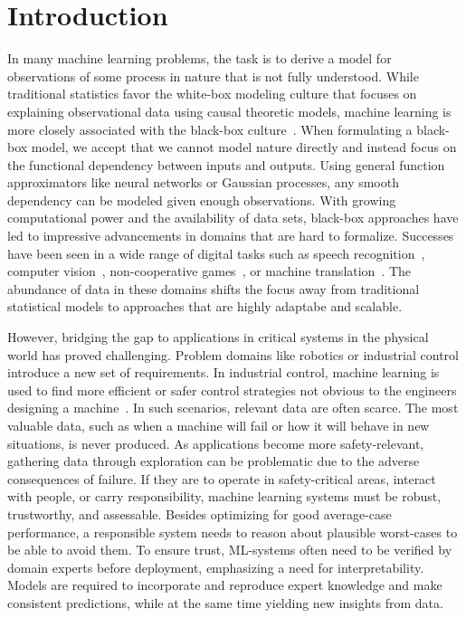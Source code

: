 \chapter{Introduction}
\label{toc:introduction}
In many machine learning problems, the task is to derive a model for observations of some process in nature that is not fully understood.
While traditional statistics favor the white-box modeling culture that focuses on explaining observational data using causal theoretic models, machine learning is more closely associated with the black-box culture~\parencite{breiman_statistical_2001,shmueli_explain_2010}.
When formulating a black-box model, we accept that we cannot model nature directly and instead focus on the functional dependency between inputs and outputs.
Using general function approximators like neural networks or Gaussian processes, any smooth dependency can be modeled given enough observations.
With growing computational power and the availability of data sets, black-box approaches have led to impressive advancements in domains that are hard to formalize.
Successes have been seen in a wide range of digital tasks such as speech recognition~\parencite{hochreiter_long_1997,chorowski_attention-based_2015,bahdanau_neural_2014,chorowski_attention-based_2015}, computer vision~\parencite{russakovsky_imagenet_2015,lecun_backpropagation_1989}, non-cooperative games~\parencite{berner_dota_2019,silver_mastering_2016}, or machine translation~\parencite{johnson_googles_2017}.
The abundance of data in these domains shifts the focus away from traditional statistical models to approaches that are highly adaptabe and scalable.

However, bridging the gap to applications in critical systems in the physical world has proved challenging.
Problem domains like robotics or industrial control introduce a new set of requirements.
In industrial control, machine learning is used to find more efficient or safer control strategies not obvious to the engineers designing a machine~\parencite{hein_benchmark_2017}.
In such scenarios, relevant data are often scarce.
The most valuable data, such as when a machine will fail or how it will behave in new situations, is never produced.
As applications become more safety-relevant, gathering data through exploration can be problematic due to the adverse consequences of failure.
If they are to operate in safety-critical areas, interact with people, or carry responsibility, machine learning systems must be robust, trustworthy, and assessable.
Besides optimizing for good average-case performance, a responsible system needs to reason about plausible worst-cases to be able to avoid them.
To ensure trust, ML-systems often need to be verified by domain experts before deployment, emphasizing a need for interpretability.
Models are required to incorporate and reproduce expert knowledge and make consistent predictions, while at the same time yielding new insights from data.

